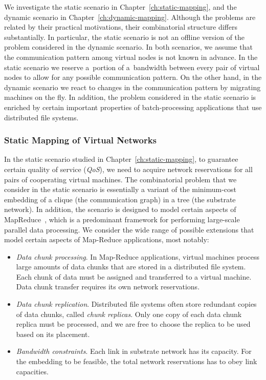 We investigate the static scenario in Chapter~\ref{ch:static-mapping}, and the dynamic scenario in Chapter~\ref{ch:dynamic-mapping}.
Although the problems are related by their practical motivations, their combinatorial structure differs substantially.
In particular, the static scenario is not an offline version of the problem considered in the dynamic scenario.
In both scenarios, we assume that the communication pattern among virtual nodes is not known in advance.
In the static scenario we reserve a~portion of a~bandwidth between every pair of virtual nodes to allow for any possible communication pattern.
On the other hand, in the dynamic scenario we react to changes in the communication pattern by migrating machines on the fly.
In addition, the problem considered in the static scenario is enriched by certain important properties of batch-processing applications that use distributed file systems.


\subsubsection{Static Mapping of Virtual Networks}
\label{sec:contributions-static-mapping}

In the static scenario studied in Chapter~\ref{ch:static-mapping}, to guarantee certain quality of service (\emph{QoS}), we need to acquire network reservations for all pairs of cooperating virtual machines.
The combinatorial problem that we consider in the static scenario is essentially a variant of the minimum-cost embedding of a clique (the communication graph) in a tree (the substrate network).
In addition, the scenario is designed to model certain aspects of MapReduce~\cite{mapreduce}, which is a predominant framework for performing large-scale parallel data processing.
We consider the wide range of possible extensions that model certain aspects of Map-Reduce applications, most notably:

\begin{itemize}
\item \emph{Data chunk processing}. In Map-Reduce applications, virtual machines process large amounts of data chunks that are stored in a distributed file system. Each chunk of data must be assigned and transferred to a virtual machine. Data chunk transfer requires its own network reservations.

\item \emph{Data chunk replication}. Distributed file systems often store redundant copies of data chunks, called \emph{chunk replicas}. Only one copy of each data chunk replica must be processed, and we are free to choose the replica to be used based on its placement.

\item \emph{Bandwidth constraints}. Each link in substrate network has its capacity. For the embedding to be feasible, the total network reservations has to obey link capacities.
\end{itemize}


